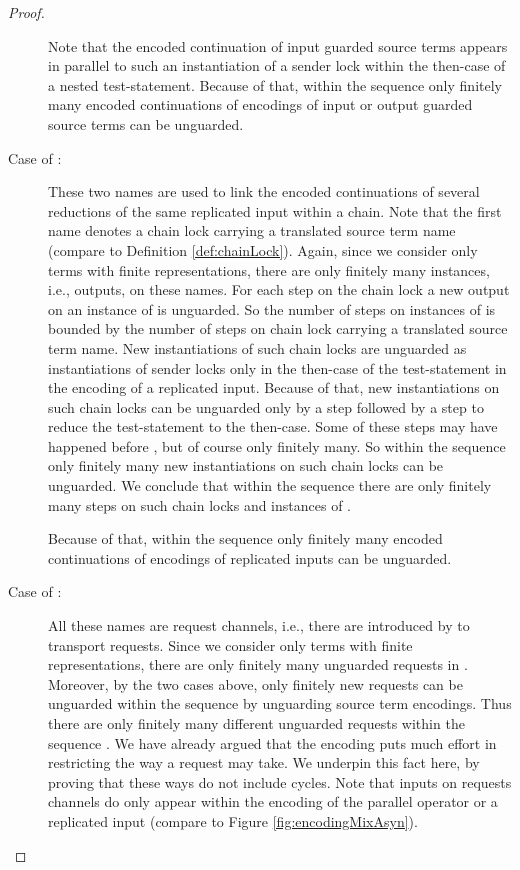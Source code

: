 \documentclass[]{llncs}
\begin{document}
\begin{proof}
\begin{description}
			Note that the encoded continuation of input guarded source terms appears in parallel to such an instantiation of a sender lock within the then-case of a nested test-statement. Because of that, within the sequence  only finitely many encoded continuations of encodings of input or output guarded source terms can be unguarded.
		\item[Case of :] These two names are used to link the encoded continuations of several reductions of the same replicated input within a chain. Note that the first name denotes a chain lock carrying a translated source term name (compare to Definition \ref{def:chainLock}). Again, since we consider only terms with finite representations, there are only finitely many instances, i.e., outputs, on these names. For each step on the chain lock a new output on an instance of  is unguarded. So the number of steps on instances of   is bounded by the number of steps on chain lock carrying a translated source term name. New instantiations of such chain locks are unguarded as instantiations of sender locks only in the then-case of the test-statement in the encoding of a replicated input. Because of that, new instantiations on such chain locks can be unguarded only by a \nonAdmin step followed by a \pure \admin step to reduce the test-statement to the then-case. Some of these \nonAdmin steps may have happened before , but of course only finitely many. So within the sequence  only finitely many new instantiations on such chain locks can be unguarded. We conclude that within the sequence  there are only finitely many steps on such chain locks and instances of .
			
			Because of that, within the sequence  only finitely many encoded continuations of encodings of replicated inputs can be unguarded.
		\item[Case of :] All these names are request channels, i.e., there are introduced by  to transport requests. Since we consider only terms with finite representations, there are only finitely many unguarded requests in . Moreover, by the two cases above, only finitely new requests can be unguarded within the sequence  by unguarding source term encodings. Thus there are only finitely many different unguarded requests within the sequence . We have already argued that the encoding  puts much effort in restricting the way a request may take. We underpin this fact here, by proving that these ways do not include cycles. Note that inputs on requests channels do only appear within the encoding of the parallel operator or a replicated input (compare to Figure \ref{fig:encodingMixAsyn}).
			

\end{description}
\end{proof}
\end{document}
